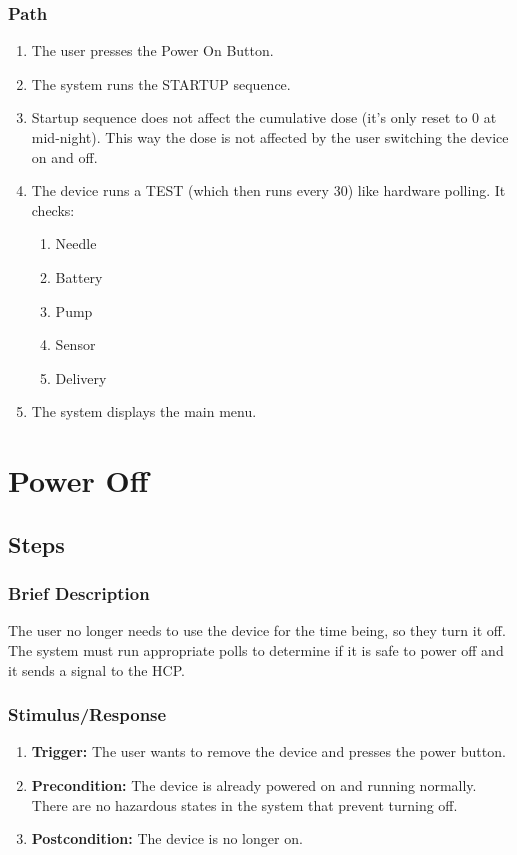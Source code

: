 \documentclass{scrreprt}
\begin{document}
    \subsubsection{Path}
    \begin{enumerate}
        \item The user presses the Power On Button.
        \item The system runs the STARTUP sequence.
        \item Startup sequence does not affect the cumulative dose (it's only reset to 0 at mid-night).  This way the dose is not affected by the user switching the device on and off.
        \item The device runs a TEST (which then runs every 30) like hardware polling. It checks:
            \begin{enumerate}
                \item Needle
                \item Battery
                \item Pump
                \item Sensor
                \item Delivery
            \end{enumerate}
        \item The system displays the main menu.
    \end{enumerate}

\section{Power Off}
\subsection{Steps}
    \subsubsection{Brief Description}
        The user no longer needs to use the device for the time being, so they turn it off. The system must run appropriate polls to determine if it is safe to power off and it sends a signal to the HCP.
    \subsubsection{Stimulus/Response}
    \begin{enumerate}
        \item \textbf{Trigger:} The user wants to remove the device and presses the power button.
        \item \textbf{Precondition:} The device is already powered on and running normally. There are no hazardous states in the system that prevent turning off.
        \item \textbf{Postcondition:} The device is no longer on.
    \end{enumerate}
\end{document}

